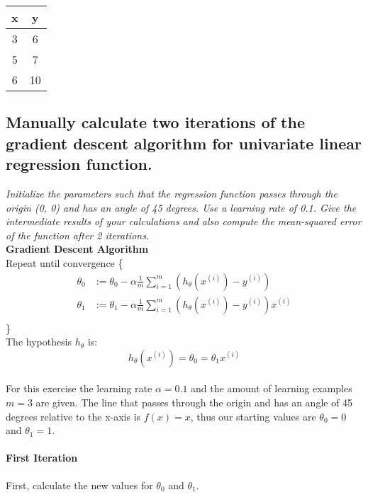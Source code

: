 \documentclass[12pt, a4paper]{article}
\begin{document}
\begin{table}[h!]
\centering
\begin{tabular}{c|c}
   x & y \\
   \hline
   3 & 6\\
   5 & 7\\
   6 & 10
\end{tabular}
\end{table}	

	\subsection{Manually  calculate two iterations of the gradient descent algorithm
	for univariate linear regression function. }
	
	\textit{Initialize the parameters such that the regression function
	passes through the origin (0, 0) and has an angle of 45 degrees. Use a learning rate of 0.1. Give the
	intermediate results of your calculations and also compute the mean-squared error of the function
	after 2 iterations.}\\
	
	\textbf{Gradient Descent Algorithm}\\
	
	Repeat until convergence \{
	\begin{align*}
	\theta _0 &:= \theta _0 - \alpha \frac{1}{m} \sum\limits_{i=1}^m (h _{\theta} (x ^{(i)}) - y ^{(i)})\\
	\theta _1 &:= \theta _1 - \alpha \frac{1}{m} \sum\limits_{i=1}^m (h _{\theta} (x ^{(i)}) - y ^{(i)})x^{(i)} \\
	\end{align*}
	\}\\
	
	The hypothesis $h_\theta$ is:
	\begin{equation}
	h_\theta (x^{(i)}) = \theta_0 = \theta_1 x^{(i)}
	\end{equation}\\
	
	For this exercise the learning rate $\alpha=0.1$ and the amount of learning examples $m=3$ are given. The line that passes through the origin and has an angle of 45 degrees relative to 		the x-axis is $f(x) = x$, thus our starting values are $\theta_0 = 0$ and $\theta_1 = 1$.
	
	\paragraph{First Iteration}
	First, calculate the new values for $\theta_0$ and $\theta_1$.
	
\end{document}
